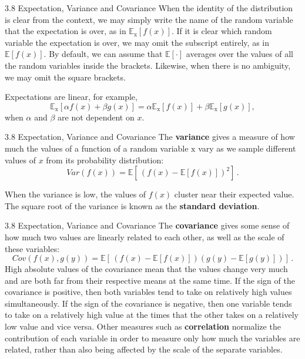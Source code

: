 \begin{frame}{3.8 Expectation, Variance and Covariance}
    \justifying
    When the identity of the distribution is clear from the context, we may simply write the name of the random variable that the expectation is over, as in $\mathbb{E}_{\mathrm{x}}[f(x)]$. If it is clear which random variable the expectation is over, we may omit the subscript entirely, as in $\mathbb{E}[f(x)]$. By default, we can assume that $\mathbb{E}[\cdot]$ averages over the values of all the random variables inside the brackets. Likewise, when there is no ambiguity, we may omit the square brackets.
    
    Expectations are linear, for example,
    \begin{equation}
        \mathbb{E}_{\mathrm{x}}[\alpha f(x) + \beta g(x)] = \alpha\mathbb{E}_{\mathrm{x}}[f(x)] + \beta\mathbb{E}_{\mathrm{x}}[g(x)],
        \label{eq:3_11}
    \end{equation}
    when $\alpha$ and $\beta$ are not dependent on $x$.
\end{frame}

\begin{frame}{3.8 Expectation, Variance and Covariance}
    \justifying
    The \textbf{variance} gives a measure of how much the values of a function of a random variable $\mathrm{x}$ vary as we sample different values of $x$ from its probability distribution:
    \begin{equation}
        Var(f(x)) = \mathbb{E}[\,(f(x) - \mathbb{E}[f(x)])^{2}]\,.
        \label{eq:3_12}
    \end{equation}
    
    When the variance is low, the values of $f(x)$ cluster near their expected value. The square root of the variance is known as the \textbf{standard deviation}.
\end{frame}

\begin{frame}{3.8 Expectation, Variance and Covariance}
    \justifying
    The \textbf{covariance} gives some sense of how much two values are linearly related to each other, as well as the scale of these variables:
    \begin{equation}
        Cov(f(x), g(y)) = \mathbb{E}[\,(f(x) - \mathbb{E}[f(x)]) (g(y) - \mathbb{E}[g(y)])]\,.
        \label{eq:3_13}
    \end{equation}
    High absolute values of the covariance mean that the values change very much and are both far from their respective means at the same time. If the sign of the covariance is positive, then both variables tend to take on relatively high values simultaneously. If the sign of the covariance is negative, then one variable tends to take on a relatively high value at the times that the other takes on a relatively low value and vice versa. Other measures such as \textbf{correlation} normalize the contribution of each variable in order to measure only how much the variables are related, rather than also being affected by the scale of the separate variables.
\end{frame}

